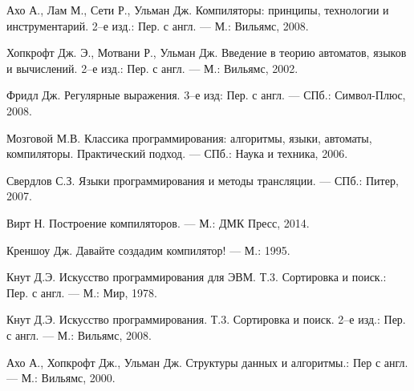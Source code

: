 \documentclass[10pt]{report}
\begin{document}
\newpage
\renewcommand{\bibname}{Список литературы}
\begin{thebibliography}{9}
 Ахо А., Лам М., Сети Р., Ульман Дж. Компиляторы: принципы, технологии и инструментарий. 2--е изд.: Пер. с англ. --- М.: Вильямс, 2008.

 Хопкрофт Дж. Э., Мотвани Р., Ульман Дж. Введение в теорию автоматов, языков и вычислений.  2--е изд.: Пер. с англ. --- М.: Вильямс, 2002.

 Фридл Дж. Регулярные выражения. 3--е изд: Пер. с англ. --- СПб.: Символ-Плюс, 2008.

 Мозговой М.В. Классика программирования: алгоритмы, языки, автоматы, компиляторы. Практический подход. --- СПб.: Наука и техника, 2006.

 Свердлов С.З. Языки программирования и методы трансляции. --- СПб.: Питер, 2007.

 Вирт Н. Построение компиляторов. --- М.: ДМК Пресс, 2014.

 Креншоу Дж. Давайте создадим компилятор! --- М.: 1995.

 Кнут Д.Э. Искусство программирования для ЭВМ. Т.3. Сортировка и поиск.: Пер. с англ. --- М.: Мир, 1978.

 Кнут Д.Э. Искусство программирования. Т.3. Сортировка и поиск. 2--е изд.: Пер. с англ. --- М.: Вильямс, 2008.

 Ахо А., Хопкрофт Дж., Ульман Дж. Структуры данных и алгоритмы.: Пер с англ. --- М.: Вильямс, 2000.
\end{thebibliography}
\end{document}
